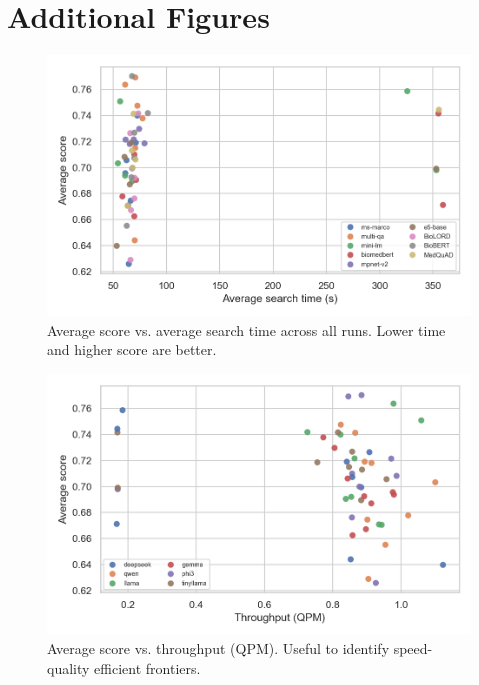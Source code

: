 \section{Additional Figures}
\begin{figure}[!htbp]
  \centering
  \includegraphics[width=\textwidth]{chap4_results/images/time_vs_score.png}
  \caption{Average score vs. average search time across all runs. Lower time and higher score are better.}
  \label{fig:time_vs_score}
\end{figure}

\begin{figure}[!htbp]
  \centering
  \includegraphics[width=\textwidth]{chap4_results/images/quality_vs_throughput.png}
  \caption{Average score vs. throughput (QPM). Useful to identify speed-quality efficient frontiers.}
  \label{fig:quality_vs_throughput}
\end{figure}


